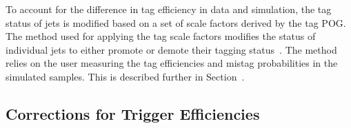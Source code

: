 To account for the difference in \PQb tag efficiency in data and simulation, the \PQb tag status of jets is modified based on a set of scale factors derived by the \PQb tag POG.  The method used for applying the \PQb tag scale factors modifies the status of individual jets to either promote or demote their \PQb tagging status~\cite{twiki:btag_method}.  The method relies on the user measuring the \PQb tag efficiencies and mistag probabilities in the simulated samples.  This is described further in Section~\label{sec:analysis:calibration:btag}.








\subsection{Corrections for Trigger Efficiencies}
\label{sec:analysis:calibration:trigger}


